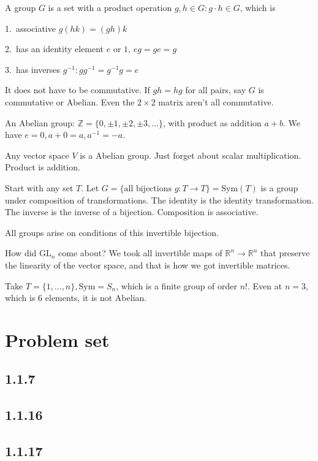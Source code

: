 \documentclass[12pt]{article}
\newcommand{\RR}{\mathbb{R}}
\newcommand{\GL}{\text{GL}}
\newcommand{\inv}[1]{#1^{-1}}
\theoremstyle{definition}
\begin{document}
A group \(G\) is a set with a product operation \(g,h\in G: g\cdot h\in G\), which is

1.\ associative \(g(hk) = (gh)k\)

2.\ has an identity element \(e\) or \(1\), \(eg=ge=g\)

3.\ has inverses \(\inv{g}: g\inv{g}=\inv{g}g=e\)

It does not have to be commutative. If \(gh=hg\) for all pairs, say \(G\) is commutative or Abelian.
Even the \(2 \times 2\) matrix aren't all commutative.

An Abelian group: \(\mathbb{Z} = \{0, \pm1, \pm2, \pm3, \ldots\} \),
with product as addition \(a + b\). We have \(e = 0, a+0=a, \inv{a}=-a\).

Any vector space \(V\) is a Abelian group. Just forget about scalar multiplication. Product is addition.

Start with any set \(T\). Let \(G = \{\text{all bijections } g:T\rightarrow T\}=\text{Sym}(T)\)
is a group under composition of transformations. The identity is the identity transformation.
The inverse is the inverse of a bijection. Composition is associative.

All groups arise on conditions of this invertible bijection.

How did \(\GL_n\) come about? We took all invertible maps of \(\RR^n\rightarrow\RR^n\) that
preserve the linearity of the vector space, and that is how we got invertible matrices.

Take \(T=\{1,\ldots,n\},\text{Sym}=S_n\), which is a finite group of order \(n!\).
Even at \(n=3\), which is 6 elements, it is not Abelian.

\section{Problem set}
\subsection{1.1.7}
\subsection{1.1.16}
\subsection{1.1.17}
\end{document}
